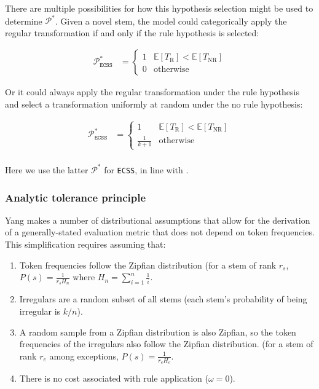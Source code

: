 \documentclass[
   11pt,
       ]{book}
\begin{document}
There are multiple possibilities for how this hypothesis selection might be used
to determine \(\mathcal{P}^*\). Given a novel stem, the model could categorically
apply the regular transformation if and only if the rule hypothesis is selected:

\[
\begin{aligned}
\mathcal{P}^*_{\texttt{ECSS}}
&=
  \begin{cases}
    1 & \mathbb{E}[T_\text{R}] < \mathbb{E}[T_\text{NR}] \\
    0 & \text{otherwise}
  \end{cases}
\end{aligned}
\]

Or it could always apply the regular transformation under the rule hypothesis
and select a transformation uniformly at random under the no rule hypothesis:

\[
\begin{aligned}
\mathcal{P}^*_{\texttt{ECSS}}
&=
  \begin{cases}
    1 & \mathbb{E}[T_\text{R}] < \mathbb{E}[T_\text{NR}] \\
    \frac{1}{k+1} & \text{otherwise}
  \end{cases}\\[2ex]
\end{aligned}
\]

Here we use the latter \(\mathcal{P}^*\) for \texttt{ECSS}, in line with \citep{schuler2016}.

\hypertarget{tp}{%
\subsubsection{Analytic tolerance principle}\label{tp}}

Yang makes a number of distributional assumptions that allow for the derivation
of a generally-stated evaluation metric that does not depend on token
frequencies. This simplification requires assuming that:

\begin{enumerate}
\def\labelenumi{(\arabic{enumi})}
\item
  Token frequencies follow the Zipfian distribution (for a stem of rank \(r_s\),
  \(P(s)=\frac{1}{r_sH_n}\) where \(H_n = \sum_{i=1}^n \frac{1}{i}\).
\item
  Irregulars are a random subset of all stems (each stem's probability of
  being irregular is \(k/n\)).
\item
  A random sample from a Zipfian distribution is also Zipfian, so the token
  frequencies of the irregulars also follow the Zipfian distribution. (for a
  stem of rank \(r_e\) among exceptions, \(P(s)=\frac{1}{r_eH_e}\).
\item
  There is no cost associated with rule application (\(\omega=0\)).
\end{enumerate}
\end{document}
